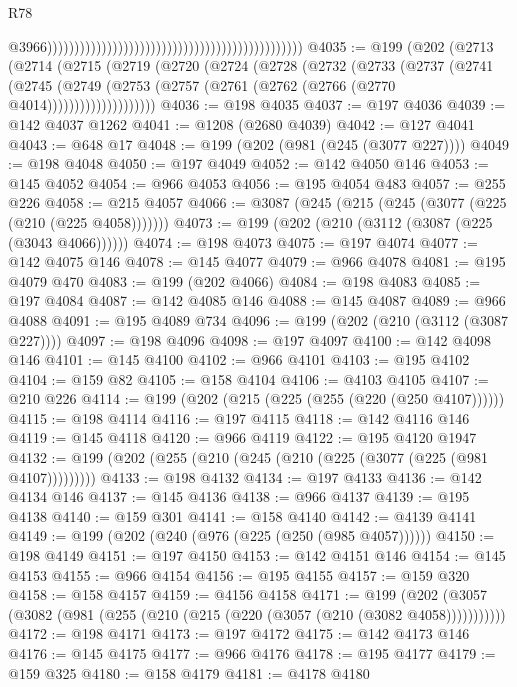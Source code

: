 \begin{lexlean}{R78}
\begin{coremodule}
                                                                                                  @3966)))))))))))))))))))))))))))))))))))))))))))))))
@4035 := @199
    (@202
      (@2713
        (@2714
          (@2715
            (@2719
              (@2720
                (@2724
                  (@2728
                    (@2732
                      (@2733
                        (@2737
                          (@2741
                            (@2745
                              (@2749
                                (@2753 (@2757 (@2761 (@2762 (@2766 (@2770 @4014))))))))))))))))))))
@4036 := @198 @4035
@4037 := @197 @4036
@4039 := @142 @4037 @1262
@4041 := @1208 (@2680 @4039)
@4042 := @127 @4041
@4043 := @648 @17
@4048 := @199 (@202 (@981 (@245 (@3077 @227))))
@4049 := @198 @4048
@4050 := @197 @4049
@4052 := @142 @4050 @146
@4053 := @145 @4052
@4054 := @966 @4053
@4056 := @195 @4054 @483
@4057 := @255 @226
@4058 := @215 @4057
@4066 := @3087 (@245 (@215 (@245 (@3077 (@225 (@210 (@225 @4058)))))))
@4073 := @199 (@202 (@210 (@3112 (@3087 (@225 (@3043 @4066))))))
@4074 := @198 @4073
@4075 := @197 @4074
@4077 := @142 @4075 @146
@4078 := @145 @4077
@4079 := @966 @4078
@4081 := @195 @4079 @470
@4083 := @199 (@202 @4066)
@4084 := @198 @4083
@4085 := @197 @4084
@4087 := @142 @4085 @146
@4088 := @145 @4087
@4089 := @966 @4088
@4091 := @195 @4089 @734
@4096 := @199 (@202 (@210 (@3112 (@3087 @227))))
@4097 := @198 @4096
@4098 := @197 @4097
@4100 := @142 @4098 @146
@4101 := @145 @4100
@4102 := @966 @4101
@4103 := @195 @4102
@4104 := @159 @82
@4105 := @158 @4104
@4106 := @4103 @4105
@4107 := @210 @226
@4114 := @199 (@202 (@215 (@225 (@255 (@220 (@250 @4107))))))
@4115 := @198 @4114
@4116 := @197 @4115
@4118 := @142 @4116 @146
@4119 := @145 @4118
@4120 := @966 @4119
@4122 := @195 @4120 @1947
@4132 := @199 (@202 (@255 (@210 (@245 (@210 (@225 (@3077 (@225 (@981 @4107)))))))))
@4133 := @198 @4132
@4134 := @197 @4133
@4136 := @142 @4134 @146
@4137 := @145 @4136
@4138 := @966 @4137
@4139 := @195 @4138
@4140 := @159 @301
@4141 := @158 @4140
@4142 := @4139 @4141
@4149 := @199 (@202 (@240 (@976 (@225 (@250 (@985 @4057))))))
@4150 := @198 @4149
@4151 := @197 @4150
@4153 := @142 @4151 @146
@4154 := @145 @4153
@4155 := @966 @4154
@4156 := @195 @4155
@4157 := @159 @320
@4158 := @158 @4157
@4159 := @4156 @4158
@4171 := @199 (@202 (@3057 (@3082 (@981 (@255 (@210 (@215 (@220 (@3057 (@210 (@3082 @4058)))))))))))
@4172 := @198 @4171
@4173 := @197 @4172
@4175 := @142 @4173 @146
@4176 := @145 @4175
@4177 := @966 @4176
@4178 := @195 @4177
@4179 := @159 @325
@4180 := @158 @4179
@4181 := @4178 @4180

\end{coremodule}
\end{lexlean}
